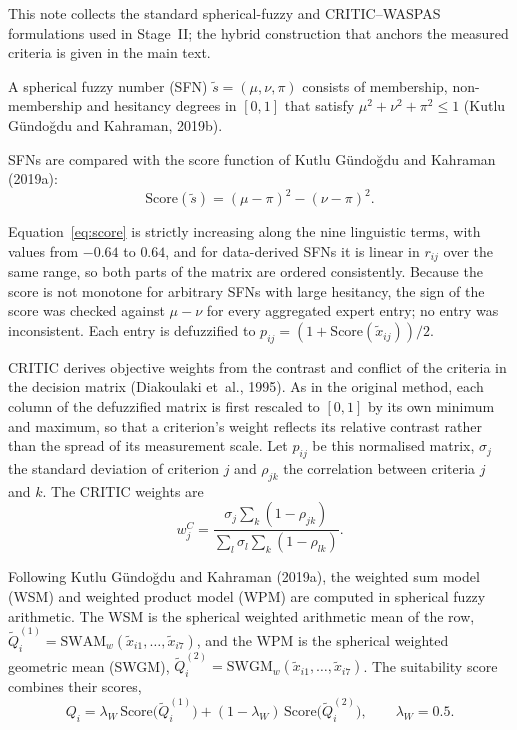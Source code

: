 This note collects the standard spherical-fuzzy and CRITIC--WASPAS formulations used in Stage~II; the hybrid construction that anchors the measured criteria is given in the main text.

A spherical fuzzy number (SFN) $\tilde{s} = (\mu, \nu, \pi)$ consists of membership, non-membership and hesitancy degrees in $[0,1]$ that satisfy $\mu^2 + \nu^2 + \pi^2 \le 1$ (Kutlu G{\"u}ndo{\u{g}}du and Kahraman, 2019b).

SFNs are compared with the score function of Kutlu G{\"u}ndo{\u{g}}du and Kahraman (2019a):
\begin{equation}
\text{Score}(\tilde{s}) = (\mu - \pi)^2 - (\nu - \pi)^2 .
\label{eq:score}
\end{equation}

Equation~\eqref{eq:score} is strictly increasing along the nine linguistic terms, with values from $-0.64$ to $0.64$, and for data-derived SFNs it is linear in $r_{ij}$ over the same range, so both parts of the matrix are ordered consistently. Because the score is not monotone for arbitrary SFNs with large hesitancy, the sign of the score was checked against $\mu-\nu$ for every aggregated expert entry; no entry was inconsistent. Each entry is defuzzified to $p_{ij} = (1 + \text{Score}(\tilde{x}_{ij}))/2$.

CRITIC derives objective weights from the contrast and conflict of the criteria in the decision matrix (Diakoulaki et~al., 1995). As in the original method, each column of the defuzzified matrix is first rescaled to $[0,1]$ by its own minimum and maximum, so that a criterion's weight reflects its relative contrast rather than the spread of its measurement scale. Let $p_{ij}$ be this normalised matrix, $\sigma_j$ the standard deviation of criterion $j$ and $\rho_{jk}$ the correlation between criteria $j$ and $k$. The CRITIC weights are
\begin{equation}
w_j^{C} = \frac{\sigma_j \sum_{k}(1 - \rho_{jk})}{\sum_{l} \sigma_l \sum_{k}(1 - \rho_{lk})} .
\end{equation}

Following Kutlu G{\"u}ndo{\u{g}}du and Kahraman (2019a), the weighted sum model (WSM) and weighted product model (WPM) are computed in spherical fuzzy arithmetic. The WSM is the spherical weighted arithmetic mean of the row, $\tilde{Q}_i^{(1)} = \text{SWAM}_w(\tilde{x}_{i1},\dots,\tilde{x}_{i7})$, and the WPM is the spherical weighted geometric mean (SWGM), $\tilde{Q}_i^{(2)} = \text{SWGM}_w(\tilde{x}_{i1},\dots,\tilde{x}_{i7})$. The suitability score combines their scores,
\begin{equation}
Q_i = \lambda_W\, \text{Score}\big(\tilde{Q}_i^{(1)}\big) + (1-\lambda_W)\, \text{Score}\big(\tilde{Q}_i^{(2)}\big), \qquad \lambda_W = 0.5 .
\end{equation}
